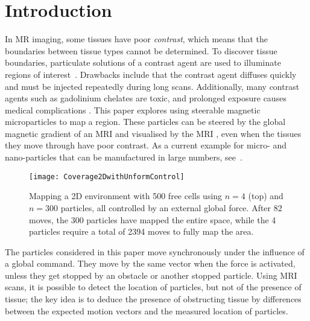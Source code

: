 \section{Introduction}\label{sec:Intro}
In MR imaging, some tissues have poor \emph{contrast}, which means that the boundaries between tissue types cannot be determined.
 To discover tissue boundaries, particulate solutions of a contrast agent are used to illuminate regions of interest~\cite{na2009inorganic}. 
 Drawbacks include that the contrast agent diffuses quickly and must be injected repeatedly during long scans. 
 Additionally, many contrast agents such as gadolinium chelates are toxic, and prolonged exposure causes medical complications \cite{caravan1999gadolinium}. 
This paper explores using steerable magnetic microparticles to map a region. 
These particles can be steered by the global magnetic gradient of an MRI and visualised by the MRI \cite{Vartholomeos2012}, even when the tissues they move through  have poor contrast.
As a current example for micro- and nano-particles that can be manufactured in large numbers, see~\cite{Chowdhury2015,martel2014computer,kim2015imparting,Donald2013,Ghosh2009,Ou2013,qiu2015magnetic}.

\begin{figure}
\begin{center}
	\texttt{[image: Coverage2DwithUnformControl]}
\end{center}
\caption{\label{fig:Coverage2DwithUnformControl}
Mapping a 2D environment with 500 free cells using $n=4$ (top) and $n=300$ particles, all controlled by an external global force.  After 82 moves, the 300 particles have mapped the entire space, while the 4 particles require a total of 2394 moves to fully map the area. 
}
\end{figure}

The particles considered in this paper move synchronously under the influence of a global command.
They move by the same vector when the force is activated,
unless they get stopped by an obstacle or another stopped particle.  
Using MRI scans, it is possible to detect the location of particles, but not of the presence of tissue;
the key idea is to deduce the presence of obstructing tissue by differences between the expected motion vectors and 
the measured location of particles.

